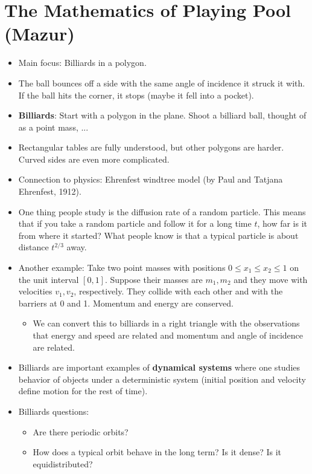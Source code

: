 \documentclass[../main.tex]{subfiles}
\begin{document}
\section{The Mathematics of Playing Pool (Mazur)}
\begin{itemize}
    \item Main focus: Billiards in a polygon.
    \item The ball bounces off a side with the same angle of incidence it struck it with. If the ball hits the corner, it stops (maybe it fell into a pocket).
    \item \textbf{Billiards}: Start with a polygon in the plane. Shoot a billiard ball, thought of as a point mass, ...
    \item Rectangular tables are fully understood, but other polygons are harder. Curved sides are even more complicated.
    \item Connection to physics: Ehrenfest windtree model (by Paul and Tatjana Ehrenfest, 1912).
    \item One thing people study is the diffusion rate of a random particle. This means that if you take a random particle and follow it for a long time $t$, how far is it from where it started? What people know is that a typical particle is about distance $t^{2/3}$ away.
    \item Another example: Take two point masses with positions $0\leq x_1\leq x_2\leq 1$ on the unit interval $[0,1]$. Suppose their masses are $m_1,m_2$ and they move with velocities $v_1,v_2$, respectively. They collide with each other and with the barriers at 0 and 1. Momentum and energy are conserved.
    \begin{itemize}
        \item We can convert this to billiards in a right triangle with the observations that energy and speed are related and momentum and angle of incidence are related.
    \end{itemize}
    \item Billiards are important examples of \textbf{dynamical systems} where one studies behavior of objects under a deterministic system (initial position and velocity define motion for the rest of time).
    \item Billiards questions:
    \begin{itemize}
        \item Are there periodic orbits?
        \item How does a typical orbit behave in the long term? Is it dense? Is it equidistributed?

\end{itemize}
\end{itemize}
\end{document}

